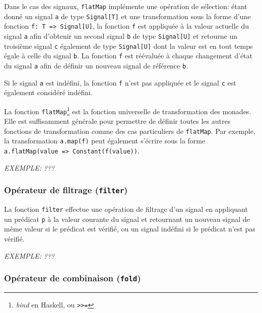 Dans le cas des signaux, \texttt{flatMap} implémente une opération de sélection: étant donné un signal \texttt{a} de type \texttt{Signal[T]} et une transformation sous la forme d'une fonction \texttt{f: T => Signal[U]}, la fonction \texttt{f} est appliquée à la valeur actuelle du signal \texttt{a} afin d'obtenir un second signal \texttt{b} de type \texttt{Signal[U]} et retourne un troisième signal \texttt{c} également de type \texttt{Signal[U]} dont la valeur est en tout temps égale à celle du signal \texttt{b}. La fonction \texttt{f} est réévaluée à chaque changement d'état du signal \texttt{a} afin de définir un nouveau signal de référence \texttt{b}.

Si le signal \texttt{a} est indéfini, la fonction \texttt{f} n'est pas appliquée et le signal \texttt{c} est également considéré indéfini.

La fonction \texttt{flatMap}\footnote{\emph{bind} en Haskell, ou \texttt{>>=}} est la fonction universelle de transformation des monades. Elle est suffisamment générale pour permettre de définir toutes les autres fonctions de transformation comme des cas particuliers de \texttt{flatMap}. Par exemple, la transformation \texttt{a.map(f)} peut également s'écrire  sous la forme \texttt{a.flatMap(value => Constant(f(value))}.

\textit{EXEMPLE: ???}

\subsubsection{Opérateur de filtrage (\texttt{filter})}

\begin{center}
\end{center}

La fonction \texttt{filter} effectue une opération de filtrage d'un signal en appliquant un prédicat \texttt{p} à la valeur courante du signal et retournant un nouveau signal de même valeur si le prédicat est vérifié, ou un signal indéfini si le prédicat n'est pas vérifié.

\textit{EXEMPLE: ???}

\subsubsection{Opérateur de combinaison (\texttt{fold})}

\begin{center}
\end{center}


